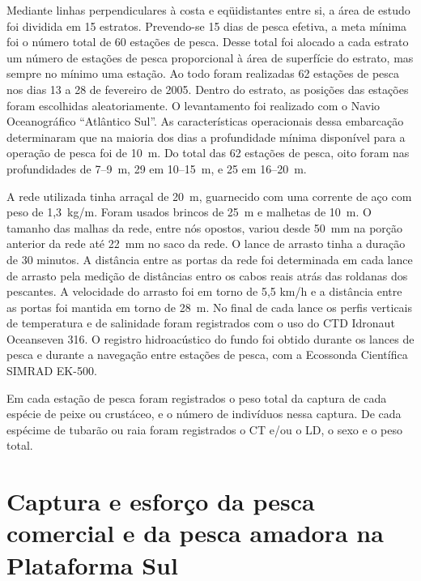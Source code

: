 \documentclass[a4paper,11pt,twoside,showtrims,onecolumn,openright,final]{memoir}
\begin{document}
Mediante linhas perpendiculares à costa e eqüidistantes entre si, a área de estudo foi 
dividida em 15 estratos. Prevendo-se 15 dias de pesca efetiva, a meta mínima foi o número total 
de 60 estações de pesca. Desse total foi alocado a cada estrato um número de estações de pesca  
proporcional à área de superfície do estrato, mas sempre no mínimo uma estação. Ao todo foram 
realizadas 62 estações de pesca nos dias 13 a 28 de fevereiro de 2005. Dentro do estrato, 
as posições das estações foram escolhidas aleatoriamente. O levantamento foi realizado com 
o Navio Oceanográfico ``Atlântico Sul''. As características operacionais dessa embarcação 
determinaram que na maioria dos dias a profundidade mínima disponível para a operação de pesca 
foi de 10~m. Do total das 62 estações de pesca, oito foram nas profundidades de 7--9~m, 29 em 10--15~m,  
e 25 em 16--20~m.

A rede utilizada tinha arraçal de 20~m, guarnecido com uma corrente de aço com peso de 1,3~kg/m. 
Foram usados brincos de 25~m e malhetas de 10~m. 
O tamanho das malhas da rede, entre nós opostos,  
variou desde 50~mm na porção anterior da rede até 22~mm no saco da rede.
O lance de arrasto tinha a duração de 30 minutos. A distância entre as portas da rede foi 
determinada em cada lance de arrasto pela medição de distâncias entro os cabos reais atrás das 
roldanas dos pescantes. A velocidade do arrasto foi em torno de 5,5 km/h e a distância entre 
as portas foi mantida em torno de 28~m. No final de cada lance os perfis verticais de temperatura 
e de salinidade foram registrados com o uso do CTD Idronaut Oceanseven 316.
O registro hidroacústico 
do fundo foi obtido durante os lances de pesca e durante a navegação entre estações de pesca, 
com a Ecossonda Científica SIMRAD EK-500.

Em cada estação de pesca foram  registrados o peso total da captura de cada espécie de peixe 
ou crustáceo, e o número de indivíduos nessa captura. De cada espécime de tubarão ou raia 
foram registrados o CT e/ou o LD, o sexo e o peso total.

\section*{Captura e esforço da pesca comercial e da pesca amadora na Plataforma Sul}
\end{document}
